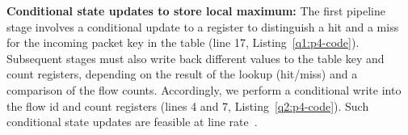 \noindent \textbf{Conditional state updates to store local maximum:} The first
pipeline stage involves a conditional update to a register to distinguish a hit
and a miss for the incoming packet key in the table (line 17,
Listing~\ref{q1:p4-code}).
%
Subsequent stages must also write back different values to the table key and
count registers, depending on the result of the lookup (hit/miss) and a
comparison of the flow counts.
%
Accordingly, we perform a conditional write into the flow id and count registers
(lines 4 and 7, Listing~\ref{q2:p4-code}).
%
%
Such conditional state updates are feasible at line rate~\cite{domino,minions}.


\iffalse
\begin{figure}[h]

\caption{Second and subsequent stages in our scheme where incoming flow is compared against the flow in the location that it hashes to and a conditional update is made depending on which of the two is larger in size currently; The code is identical to the action block from Stage 1 except that the update to the hash table (lines 18 - 22) is replaced with the conditional update in this figure}
\label{fig:Stage2P4}
\lstset{numbers=left, numberstyle=\tiny, stepnumber=1, numbersep=5pt, escapechar=`,linewidth=8cm}
\end{figure}
\fi



